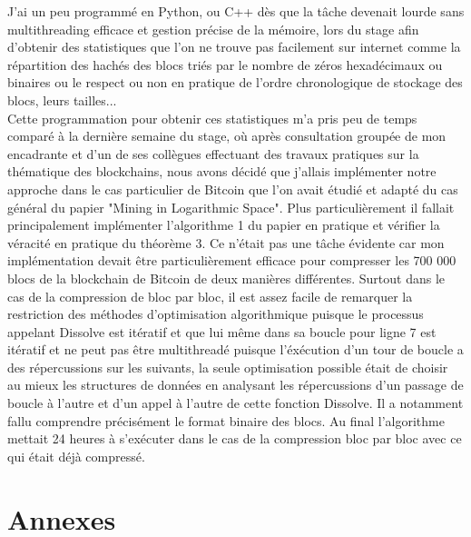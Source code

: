 \documentclass[12pt,a4paper]{article}
\begin{document}
	J'ai un peu programmé en Python, ou C++ dès que la tâche devenait lourde sans multithreading efficace et gestion précise de la mémoire, lors du stage afin d'obtenir des statistiques que l'on ne trouve pas facilement sur internet comme la répartition des hachés des blocs triés par le nombre de zéros hexadécimaux ou binaires ou le respect ou non en pratique de l'ordre chronologique de stockage des blocs, leurs tailles...\\ %
	Cette programmation pour obtenir ces statistiques m'a pris peu de temps comparé à la dernière semaine du stage, où après consultation groupée de mon encadrante et d'un de ses collègues effectuant des travaux pratiques sur la thématique des blockchains, nous avons décidé que j'allais implémenter notre approche dans le cas particulier de Bitcoin que l'on avait étudié et adapté du cas général du papier "Mining in Logarithmic Space". Plus particulièrement il fallait principalement implémenter l'algorithme 1 du papier en pratique et vérifier la véracité en pratique du théorème 3. Ce n'était pas une tâche évidente car mon implémentation devait être particulièrement efficace pour compresser les 700 000 blocs de la blockchain de Bitcoin de deux manières différentes. Surtout dans le cas de la compression de bloc par bloc, il est assez facile de remarquer la restriction des méthodes d'optimisation algorithmique puisque le processus appelant Dissolve est itératif et que lui même dans sa boucle pour ligne 7 est itératif et ne peut pas être multithreadé puisque l'éxécution d'un tour de boucle a des répercussions sur les suivants, la seule optimisation possible était de choisir au mieux les structures de données en analysant les répercussions d'un passage de boucle à l'autre et d'un appel à l'autre de cette fonction Dissolve. Il a notamment fallu comprendre précisément le format binaire des blocs. Au final l'algorithme mettait 24 heures à s'exécuter dans le cas de la compression bloc par bloc avec ce qui était déjà compressé. %
	
	\newpage
	
	\section{Annexes}
	
	
\end{document}
